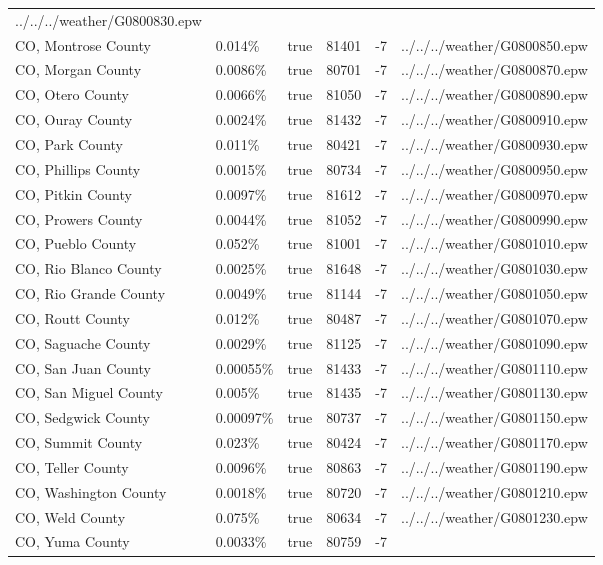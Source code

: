 \begin{longtable}[]{@{}llllll@{}}
../../../weather/G0800830.epw \\
CO, Montrose County & 0.014\% & true & 81401 & -7 &
../../../weather/G0800850.epw \\
CO, Morgan County & 0.0086\% & true & 80701 & -7 &
../../../weather/G0800870.epw \\
CO, Otero County & 0.0066\% & true & 81050 & -7 &
../../../weather/G0800890.epw \\
CO, Ouray County & 0.0024\% & true & 81432 & -7 &
../../../weather/G0800910.epw \\
CO, Park County & 0.011\% & true & 80421 & -7 &
../../../weather/G0800930.epw \\
CO, Phillips County & 0.0015\% & true & 80734 & -7 &
../../../weather/G0800950.epw \\
CO, Pitkin County & 0.0097\% & true & 81612 & -7 &
../../../weather/G0800970.epw \\
CO, Prowers County & 0.0044\% & true & 81052 & -7 &
../../../weather/G0800990.epw \\
CO, Pueblo County & 0.052\% & true & 81001 & -7 &
../../../weather/G0801010.epw \\
CO, Rio Blanco County & 0.0025\% & true & 81648 & -7 &
../../../weather/G0801030.epw \\
CO, Rio Grande County & 0.0049\% & true & 81144 & -7 &
../../../weather/G0801050.epw \\
CO, Routt County & 0.012\% & true & 80487 & -7 &
../../../weather/G0801070.epw \\
CO, Saguache County & 0.0029\% & true & 81125 & -7 &
../../../weather/G0801090.epw \\
CO, San Juan County & 0.00055\% & true & 81433 & -7 &
../../../weather/G0801110.epw \\
CO, San Miguel County & 0.005\% & true & 81435 & -7 &
../../../weather/G0801130.epw \\
CO, Sedgwick County & 0.00097\% & true & 80737 & -7 &
../../../weather/G0801150.epw \\
CO, Summit County & 0.023\% & true & 80424 & -7 &
../../../weather/G0801170.epw \\
CO, Teller County & 0.0096\% & true & 80863 & -7 &
../../../weather/G0801190.epw \\
CO, Washington County & 0.0018\% & true & 80720 & -7 &
../../../weather/G0801210.epw \\
CO, Weld County & 0.075\% & true & 80634 & -7 &
../../../weather/G0801230.epw \\
CO, Yuma County & 0.0033\% & true & 80759 & -7 &

\end{longtable}
